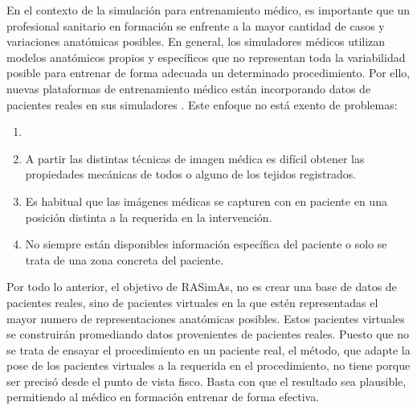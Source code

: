 En el contexto de la simulación para entrenamiento médico, es importante que un profesional sanitario en formación se enfrente a la mayor cantidad de casos y  variaciones anatómicas posibles. En general, los simuladores médicos utilizan modelos anatómicos propios y específicos que no representan toda la variabilidad posible para entrenar de forma adecuada un determinado procedimiento. 
Por ello, nuevas plataformas de entrenamiento médico están incorporando datos de pacientes reales en sus simuladores \cite{Willaert2012,Votta2013}. Este enfoque no está exento de problemas:
\begin{enumerate}
    \item {}
    \item A partir las distintas técnicas de imagen médica es difícil obtener las propiedades mecánicas de todos o alguno de los tejidos registrados.
    \item Es habitual que las imágenes médicas se capturen con en paciente en una posición distinta a la requerida en la intervención.
    \item No siempre están disponibles información específica del paciente o solo se trata de una zona concreta del paciente. 
\end{enumerate}
%
Por todo lo anterior, el objetivo de \ac{RASimAs},  no es crear una base de datos de pacientes reales, sino de pacientes virtuales en la que estén representadas el mayor numero de representaciones anatómicas posibles. Estos pacientes virtuales se construirán promediando datos provenientes de pacientes reales. Puesto que no se trata de ensayar el procedimiento en un paciente real, el método, que adapte la pose de los pacientes virtuales a la requerida en el procedimiento, no tiene porque ser precisó desde el punto de vista fisco. Basta con que el resultado sea plausible, permitiendo al médico en formación entrenar de forma efectiva.
